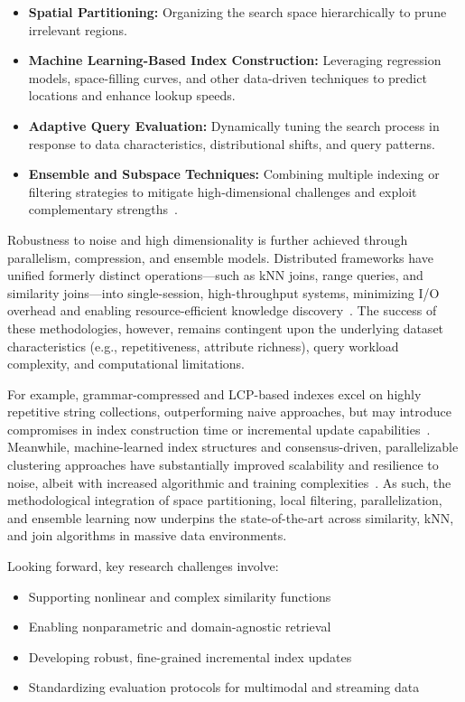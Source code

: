 \documentclass[sigconf]{acmart}
\begin{document}
\begin{itemize}
    \item \textbf{Spatial Partitioning:} Organizing the search space hierarchically to prune irrelevant regions.
    \item \textbf{Machine Learning-Based Index Construction:} Leveraging regression models, space-filling curves, and other data-driven techniques to predict locations and enhance lookup speeds.
    \item \textbf{Adaptive Query Evaluation:} Dynamically tuning the search process in response to data characteristics, distributional shifts, and query patterns.
    \item \textbf{Ensemble and Subspace Techniques:} Combining multiple indexing or filtering strategies to mitigate high-dimensional challenges and exploit complementary strengths~\cite{ref30,ref31,ref34,ref35,ref39,ref45,ref47,ref50,ref51,ref54,ref56,ref73,ref75,ref86,ref91,ref98,ref107,ref111,ref114,ref118}.
\end{itemize}

Robustness to noise and high dimensionality is further achieved through parallelism, compression, and ensemble models. Distributed frameworks have unified formerly distinct operations---such as kNN joins, range queries, and similarity joins---into single-session, high-throughput systems, minimizing I/O overhead and enabling resource-efficient knowledge discovery~\cite{ref116,ref118}. The success of these methodologies, however, remains contingent upon the underlying dataset characteristics (e.g., repetitiveness, attribute richness), query workload complexity, and computational limitations.

For example, grammar-compressed and LCP-based indexes excel on highly repetitive string collections, outperforming naive approaches, but may introduce compromises in index construction time or incremental update capabilities~\cite{ref73,ref91,ref98}. Meanwhile, machine-learned index structures and consensus-driven, parallelizable clustering approaches have substantially improved scalability and resilience to noise, albeit with increased algorithmic and training complexities~\cite{ref111,ref116}. As such, the methodological integration of space partitioning, local filtering, parallelization, and ensemble learning now underpins the state-of-the-art across similarity, kNN, and join algorithms in massive data environments.

Looking forward, key research challenges involve:

\begin{itemize}
    \item Supporting nonlinear and complex similarity functions
    \item Enabling nonparametric and domain-agnostic retrieval
    \item Developing robust, fine-grained incremental index updates
    \item Standardizing evaluation protocols for multimodal and streaming data
\end{itemize}
\end{document}
